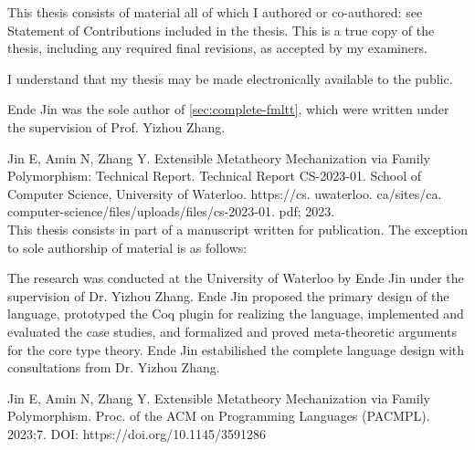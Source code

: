 





\newpage

\setcounter{page}{1}

\vspace*{\fill}


This thesis consists of material all of which I authored or co-authored: see Statement of Contributions included in the thesis. This is a true copy of the thesis, including any required final revisions, as accepted by my examiners.

I understand that my thesis may be made electronically available to the public.

\vspace*{\fill}

\newpage 


\vspace*{\fill}




Ende Jin was the sole author of \cref{sec:complete-fmltt}, which were written under the supervision of Prof. Yizhou Zhang.


Jin E, Amin N, Zhang Y. Extensible Metatheory Mechanization via Family Polymorphism: Technical Report. Technical Report CS-2023-01. School of Computer Science, University of Waterloo. https://cs. uwaterloo. ca/sites/ca. computer-science/files/uploads/files/cs-2023-01. pdf; 2023. \\


This thesis consists in part of a manuscript written for publication. The exception to sole authorship of material is as follows: 

The research was conducted at the University of Waterloo by Ende Jin under the supervision of Dr. Yizhou Zhang. Ende Jin proposed the primary design of the language, prototyped the Coq plugin for realizing the language, implemented and evaluated the case studies, and formalized and proved meta-theoretic arguments for the core type theory. Ende Jin estabilished the complete language design with consultations from Dr. Yizhou Zhang.


Jin E, Amin N, Zhang Y. Extensible Metatheory Mechanization via Family Polymorphism. Proc. of the ACM on Programming Languages (PACMPL). 2023;7. DOI: https://doi.org/10.1145/3591286



